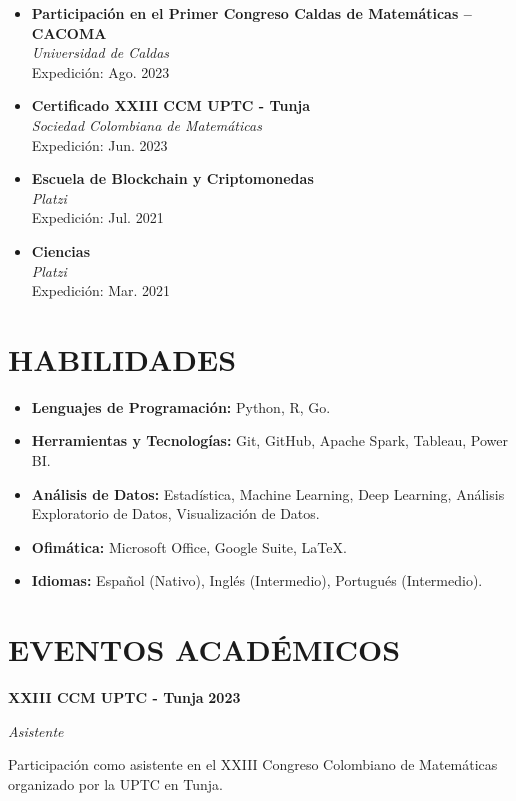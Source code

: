 \documentclass[paper=a4,fontsize=11pt]{scrartcl} %
\newcommand{\sepspace}{\vspace*{0.8em}}
\newcommand{\NewPart}[1]{\section*{\uppercase{#1}}}
\newcommand{\EducationEntry}[4]{%
  \noindent \textbf{#1} \hfill \textbf{#2} \par
  \noindent \textit{#3} \par
  \noindent \small #4 
  \normalsize \par \sepspace
}
\begin{document}
\begin{itemize}[leftmargin=*, noitemsep]
  \item \textbf{Participación en el Primer Congreso Caldas de Matemáticas – CACOMA} \\
        \textit{Universidad de Caldas} \\
        Expedición: Ago. 2023

  \item \textbf{Certificado XXIII CCM UPTC - Tunja} \\
        \textit{Sociedad Colombiana de Matemáticas} \\
        Expedición: Jun. 2023

  \item \textbf{Escuela de Blockchain y Criptomonedas} \\
        \textit{Platzi} \\
        Expedición: Jul. 2021 

  \item \textbf{Ciencias} \\
        \textit{Platzi} \\
        Expedición: Mar. 2021 
\end{itemize}

\sepspace

\NewPart{Habilidades}

\begin{itemize}[leftmargin=*, noitemsep]
    \item \textbf{Lenguajes de Programación:} Python, R, Go.
    \item \textbf{Herramientas y Tecnologías:} Git, GitHub, Apache Spark, Tableau, Power BI.
    \item \textbf{Análisis de Datos:} Estadística, Machine Learning, Deep Learning, Análisis Exploratorio de Datos, Visualización de Datos.
    \item \textbf{Ofimática:} Microsoft Office, Google Suite, \LaTeX.
    \item \textbf{Idiomas:} Español (Nativo), Inglés (Intermedio), Portugués (Intermedio).
\end{itemize}

\sepspace

\NewPart{Eventos Académicos}

\EducationEntry{XXIII CCM UPTC - Tunja}{2023}{Asistente}{%
Participación como asistente en el XXIII Congreso Colombiano de Matemáticas organizado por la UPTC en Tunja.
}
\end{document}

